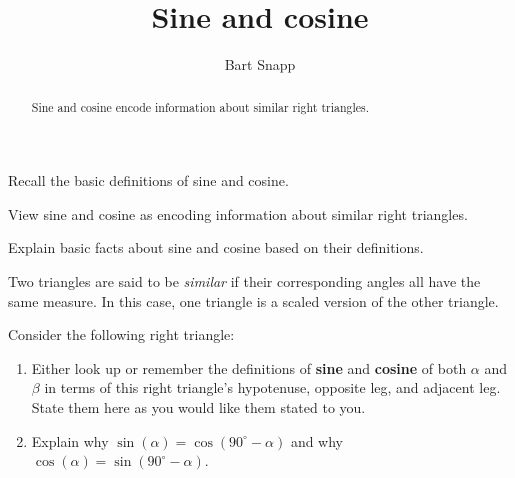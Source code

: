 \documentclass[noauthor,nooutcomes,hints,handout]{ximera}
\title{Sine and cosine}
\author{Bart Snapp}
\begin{document}
\begin{abstract}
  Sine and cosine encode information about similar right triangles.
\end{abstract}
\maketitle

\begin{listOutcomes}
\item Recall the basic definitions of sine and cosine.
\item View sine and cosine as encoding information about similar right
  triangles.
\item Explain basic facts about sine and cosine based on their
  definitions.
\end{listOutcomes}



\begin{definition}
 Two triangles are said to be \emph{similar} if their corresponding angles all have the same measure.  In this case, one triangle is a scaled version of the other triangle.
\end{definition}


\mynewpage


\begin{question}
  Consider the following right triangle:
  \begin{center}
    \end{center}
  \begin{enumerate}
  \item Either look up or remember the definitions of \textbf{sine}
    and \textbf{cosine} of both $\alpha$ and $\beta$ in terms of this
    right triangle's hypotenuse, opposite leg, and adjacent leg. State them here as you would like them stated to you.  
    \item Explain why $\sin(\alpha) =
    \cos(90^\circ-\alpha)$ and why $\cos(\alpha) =
    \sin(90^\circ-\alpha)$.
\end{enumerate}
\end{question}
\mynewpage
\end{document}
